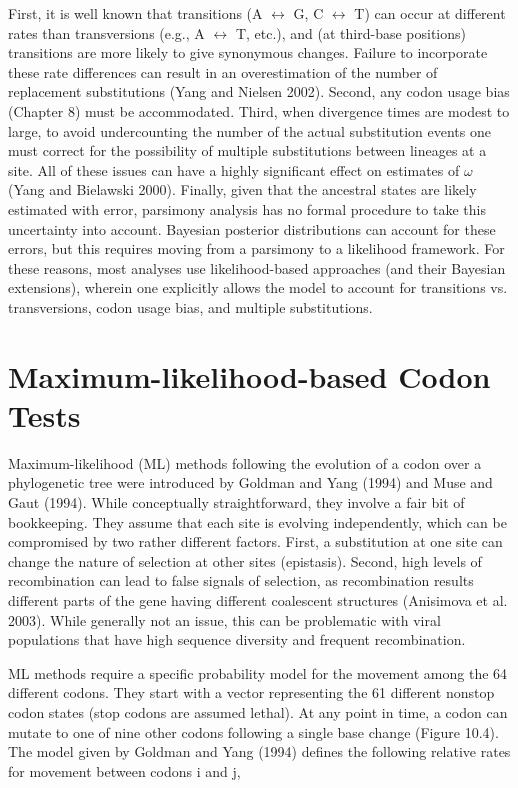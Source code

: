 \documentclass{article}
\begin{document}
First, it is well known that transitions (A $\leftrightarrow$ G, C $\leftrightarrow$ T) can occur at different rates than transversions (e.g., A $\leftrightarrow$ T, etc.), and (at third-base positions) transitions are more likely to give synonymous changes. Failure to incorporate these rate differences can result in an overestimation of the number of replacement substitutions (Yang and Nielsen 2002). Second, any codon usage bias (Chapter 8) must be accommodated. Third, when divergence times are modest to large, to avoid undercounting the number of the actual substitution events one must correct for the possibility of multiple substitutions between lineages at a site. All of these issues can have a highly significant effect on estimates of $\omega$ (Yang and Bielawski 2000). Finally, given that the ancestral states are likely estimated with error, parsimony analysis has no formal procedure to take this uncertainty into account. Bayesian posterior distributions can account for these errors, but this requires moving from a parsimony to a likelihood framework. For these reasons, most analyses use likelihood-based approaches (and their Bayesian extensions), wherein one explicitly allows the model to account for transitions vs. transversions, codon usage bias, and multiple substitutions.

\section{Maximum-likelihood-based Codon Tests}
Maximum-likelihood (ML) methods following the evolution of a codon over a phylogenetic tree were introduced by Goldman and Yang (1994) and Muse and Gaut (1994). While conceptually straightforward, they involve a fair bit of bookkeeping. They assume that each site is evolving independently, which can be compromised by two rather different factors. First, a substitution at one site can change the nature of selection at other sites (epistasis). Second, high levels of recombination can lead to false signals of selection, as recombination results different parts of the gene having different coalescent structures (Anisimova et al. 2003). While generally not an issue, this can be problematic with viral populations that have high sequence diversity and frequent recombination.

ML methods require a specific probability model for the movement among the 64 different codons. They start with a vector representing the 61 different nonstop codon states (stop codons are assumed lethal). At any point in time, a codon can mutate to one of nine other codons following a single base change (Figure 10.4). The model given by Goldman and Yang (1994) defines the following relative rates for movement between codons i and j,
\end{document}
